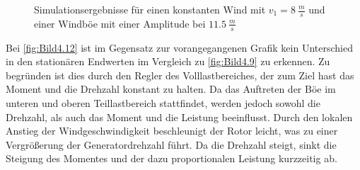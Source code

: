 \begin{figure}[H]
   \centering
   \caption[Windböensimulation bei langsamem Wind]{Simulationsergebnisse für einen konstanten Wind mit $v_1 = \SI{8}{\frac{m}{s}}$ und einer Windböe mit einer Amplitude bei $\SI{11.5}{\frac{m}{s}}$}
   \label{fig:Bild4.11}
\end{figure}

Bei \autoref{fig:Bild4.12} ist im Gegensatz zur vorangegangenen Grafik kein Unterschied in den stationären Endwerten im Vergleich zu \autoref{fig:Bild4.9} zu erkennen. Zu begründen ist dies durch den Regler des Volllastbereiches, der zum Ziel hast das Moment und die Drehzahl konstant zu halten. Da das Auftreten der Böe im unteren und oberen Teillastbereich stattfindet, werden jedoch sowohl die Drehzahl, als auch das Moment und die Leistung beeinflusst. Durch den lokalen Anstieg der Windgeschwindigkeit beschleunigt der Rotor leicht, was zu einer Vergrößerung der Generatordrehzahl führt. Da die Drehzahl steigt, sinkt die Steigung des Momentes und der dazu proportionalen Leistung kurzzeitig ab.


